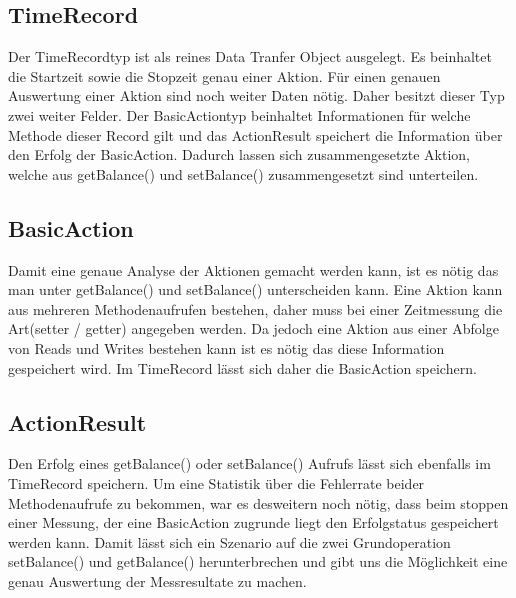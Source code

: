 \subsection{TimeRecord}
\label{sec:timeRecord}
Der TimeRecordtyp ist als reines Data Tranfer Object ausgelegt. Es beinhaltet die Startzeit sowie die Stopzeit genau einer Aktion. Für einen genauen Auswertung einer Aktion sind noch weiter Daten nötig. Daher besitzt dieser Typ zwei weiter Felder. Der BasicActiontyp beinhaltet Informationen für welche Methode dieser Record gilt und das ActionResult speichert die Information über den Erfolg der BasicAction. Dadurch lassen sich zusammengesetzte Aktion, welche aus getBalance() und setBalance() zusammengesetzt sind unterteilen.

\subsection{BasicAction}
\label{sec:BasicAction}
Damit eine genaue Analyse der Aktionen gemacht werden kann, ist es nötig das man unter getBalance() und setBalance() unterscheiden kann. Eine Aktion kann aus mehreren Methodenaufrufen bestehen, daher muss bei einer Zeitmessung die Art(setter / getter) angegeben werden. Da jedoch eine Aktion aus einer Abfolge von Reads und Writes bestehen kann ist es nötig das diese Information gespeichert wird. Im TimeRecord lässt sich daher die BasicAction speichern.

\subsection{ActionResult}
\label{sec:ActionResult}
Den Erfolg eines getBalance() oder setBalance() Aufrufs lässt sich ebenfalls im TimeRecord speichern. Um eine Statistik über die Fehlerrate beider Methodenaufrufe zu bekommen, war es desweitern noch nötig, dass beim stoppen einer Messung, der eine BasicAction zugrunde liegt den Erfolgstatus gespeichert werden kann. Damit lässt sich ein Szenario auf die zwei Grundoperation setBalance() und getBalance() herunterbrechen und gibt uns die Möglichkeit eine genau Auswertung der Messresultate zu machen.

